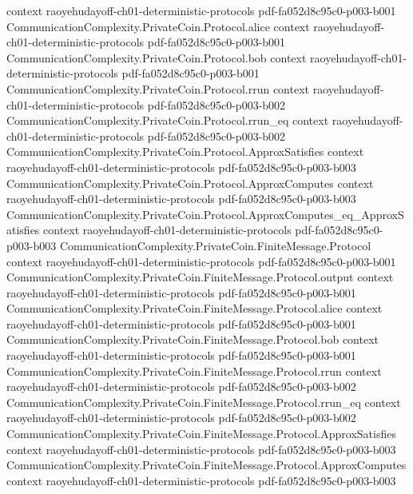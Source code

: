 \begin{theorem}
  {context}
  {raoyehudayoff-ch01-deterministic-protocols}
  {pdf-fa052d8c95c0-p003-b001}
\proofstep
  {CommunicationComplexity.PrivateCoin.Protocol.alice}
  {context}
  {raoyehudayoff-ch01-deterministic-protocols}
  {pdf-fa052d8c95c0-p003-b001}
\proofstep
  {CommunicationComplexity.PrivateCoin.Protocol.bob}
  {context}
  {raoyehudayoff-ch01-deterministic-protocols}
  {pdf-fa052d8c95c0-p003-b001}
\proofstep
  {CommunicationComplexity.PrivateCoin.Protocol.rrun}
  {context}
  {raoyehudayoff-ch01-deterministic-protocols}
  {pdf-fa052d8c95c0-p003-b002}
\proofstep
  {CommunicationComplexity.PrivateCoin.Protocol.rrun_eq}
  {context}
  {raoyehudayoff-ch01-deterministic-protocols}
  {pdf-fa052d8c95c0-p003-b002}
\proofstep
  {CommunicationComplexity.PrivateCoin.Protocol.ApproxSatisfies}
  {context}
  {raoyehudayoff-ch01-deterministic-protocols}
  {pdf-fa052d8c95c0-p003-b003}
\proofstep
  {CommunicationComplexity.PrivateCoin.Protocol.ApproxComputes}
  {context}
  {raoyehudayoff-ch01-deterministic-protocols}
  {pdf-fa052d8c95c0-p003-b003}
\proofstep
  {CommunicationComplexity.PrivateCoin.Protocol.ApproxComputes_eq_ApproxSatisfies}
  {context}
  {raoyehudayoff-ch01-deterministic-protocols}
  {pdf-fa052d8c95c0-p003-b003}
\proofstep
  {CommunicationComplexity.PrivateCoin.FiniteMessage.Protocol}
  {context}
  {raoyehudayoff-ch01-deterministic-protocols}
  {pdf-fa052d8c95c0-p003-b001}
\proofstep
  {CommunicationComplexity.PrivateCoin.FiniteMessage.Protocol.output}
  {context}
  {raoyehudayoff-ch01-deterministic-protocols}
  {pdf-fa052d8c95c0-p003-b001}
\proofstep
  {CommunicationComplexity.PrivateCoin.FiniteMessage.Protocol.alice}
  {context}
  {raoyehudayoff-ch01-deterministic-protocols}
  {pdf-fa052d8c95c0-p003-b001}
\proofstep
  {CommunicationComplexity.PrivateCoin.FiniteMessage.Protocol.bob}
  {context}
  {raoyehudayoff-ch01-deterministic-protocols}
  {pdf-fa052d8c95c0-p003-b001}
\proofstep
  {CommunicationComplexity.PrivateCoin.FiniteMessage.Protocol.rrun}
  {context}
  {raoyehudayoff-ch01-deterministic-protocols}
  {pdf-fa052d8c95c0-p003-b002}
\proofstep
  {CommunicationComplexity.PrivateCoin.FiniteMessage.Protocol.rrun_eq}
  {context}
  {raoyehudayoff-ch01-deterministic-protocols}
  {pdf-fa052d8c95c0-p003-b002}
\proofstep
  {CommunicationComplexity.PrivateCoin.FiniteMessage.Protocol.ApproxSatisfies}
  {context}
  {raoyehudayoff-ch01-deterministic-protocols}
  {pdf-fa052d8c95c0-p003-b003}
\proofstep
  {CommunicationComplexity.PrivateCoin.FiniteMessage.Protocol.ApproxComputes}
  {context}
  {raoyehudayoff-ch01-deterministic-protocols}
  {pdf-fa052d8c95c0-p003-b003}

\end{theorem}
